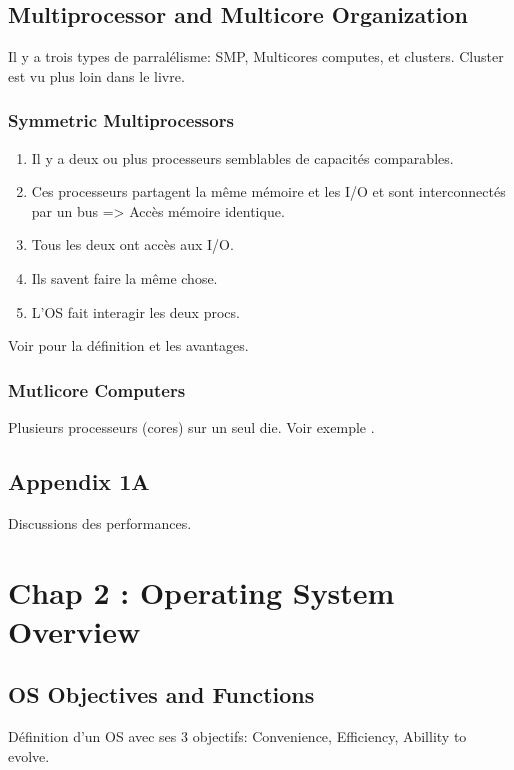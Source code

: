 \subsection{Multiprocessor and Multicore Organization}
\label{sec:smp}
Il y a trois types de parralélisme: SMP, Multicores computes, et clusters.
Cluster est vu plus loin dans le livre.

\subsubsection{Symmetric Multiprocessors}
\begin{enumerate}
	\item Il y a deux ou plus processeurs semblables de capacités comparables.
	\item Ces processeurs partagent la même mémoire et les I/O et sont interconnectés par un bus => Accès mémoire identique.
	\item Tous les deux ont accès aux I/O.
	\item Ils savent faire la même chose.
	\item L'OS fait interagir les deux procs.
\end{enumerate}
Voir \cite[p.~53-54]{stallings} pour la définition et les avantages.

\subsubsection{Mutlicore Computers}
Plusieurs processeurs (cores) sur un seul die.
Voir exemple \cite[p.~56]{stallings}.

\subsection{Appendix 1A}
Discussions des performances.

\newpage


\section{Chap 2 : Operating System Overview}

\subsection{OS Objectives and Functions}
Définition d'un OS avec ses 3 objectifs: Convenience, Efficiency, Abillity to evolve.

